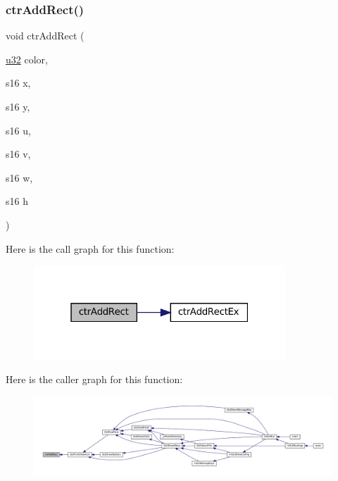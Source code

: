 \subsubsection{\texorpdfstring{ctr\+Add\+Rect()}{ctrAddRect()}}
{\footnotesize\ttfamily void ctr\+Add\+Rect (\begin{DoxyParamCaption}\item[{\mbox{\hyperlink{sqlite3_8c_a03ad5adfaeb9b7640dde78a0cc390319}{u32}}}]{color,  }\item[{s16}]{x,  }\item[{s16}]{y,  }\item[{s16}]{u,  }\item[{s16}]{v,  }\item[{s16}]{w,  }\item[{s16}]{h }\end{DoxyParamCaption})}

Here is the call graph for this function\+:
\nopagebreak
\begin{figure}[H]
\begin{center}
\leavevmode
\includegraphics[width=268pt]{ctr-gpu_8h_a5a8136bc8fce40ba12da3cfaaa617bd4_cgraph}
\end{center}
\end{figure}
Here is the caller graph for this function\+:
\nopagebreak
\begin{figure}[H]
\begin{center}
\leavevmode
\includegraphics[width=350pt]{ctr-gpu_8h_a5a8136bc8fce40ba12da3cfaaa617bd4_icgraph}
\end{center}
\end{figure}
\mbox{\label{ctr-gpu_8h_aa59622aca4a180cff8a77bbc0397f4de}} 
